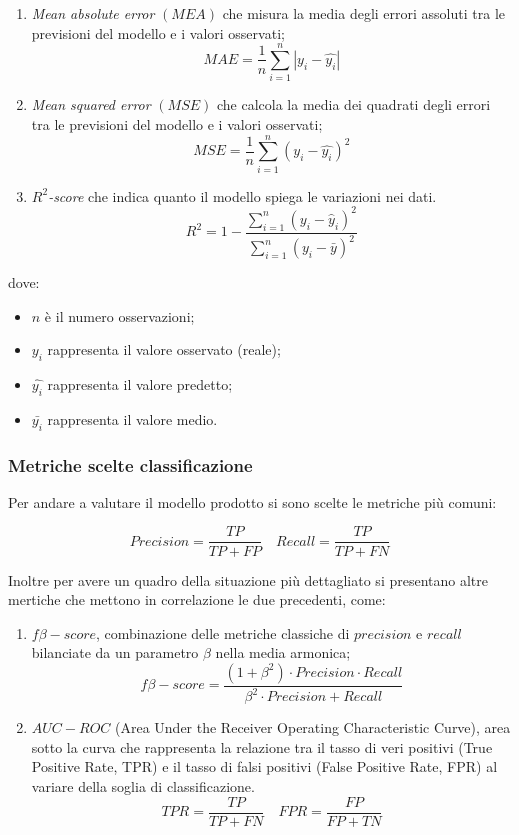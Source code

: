 \documentclass[italian,12pt,a4paper]{article}
\begin{document}
				\begin{enumerate}
					\item\textit{ Mean absolute error} $(MEA)$ che misura la media degli errori assoluti tra le previsioni del modello e i valori osservati; $$MAE = \frac{1}{n}\sum_{i = 1}^{n}|y_i - \hat{y_i}|$$
					\item \textit{Mean squared error} $(MSE)$ che calcola la media dei quadrati degli errori tra le previsioni del modello e i valori osservati; $$MSE = \frac{1}{n}\sum_{i = 1}^{n}(y_i - \hat{y_i})^2$$
					\item \textit{$R^2$-score} che indica quanto il modello spiega le variazioni nei dati. $$R^2 = 1 - \frac{\sum_{i=1}^{n}(y_i - \hat{y}_i)^2}{\sum_{i=1}^{n}(y_i - \bar{y})^2} $$
				\end{enumerate}
	
				dove:
				\begin{itemize}
					\item $n$ è il numero osservazioni;
					\item $y_i$ rappresenta il valore osservato (reale);
					\item $\hat{y_i}$ rappresenta il valore predetto;
					\item $\bar{y_i}$ rappresenta il valore medio.
				\end{itemize}

	
			\subsubsection{Metriche scelte classificazione}
				Per andare a valutare il modello prodotto si sono scelte le metriche più comuni:
	
				$$Precision = \frac{TP}{TP+FP} \quad Recall = \frac{TP}{TP+FN}$$

				Inoltre per avere un quadro della situazione più dettagliato si presentano altre mertiche che mettono in correlazione le due precedenti, come:
				
		
				\begin{enumerate}
					\item $f\beta-score$,  combinazione delle metriche classiche di $precision$ e $recall$ bilanciate da un parametro $\beta$ nella media armonica;
					$$f\beta-score = \frac{(1+ \beta^2) \cdot Precision \cdot Recall}{\beta^2 \cdot Precision + Recall}$$
					\item $AUC-ROC$ (Area Under the Receiver Operating Characteristic Curve), area sotto la curva che rappresenta la relazione tra il tasso di veri positivi (True Positive Rate, TPR) e il tasso di falsi positivi (False Positive Rate, FPR) al variare della soglia di classificazione.
					$$TPR = \frac{TP}{TP+FN} \quad FPR = \frac{FP}{FP+TN}$$
				\end{enumerate} 
\end{document}
